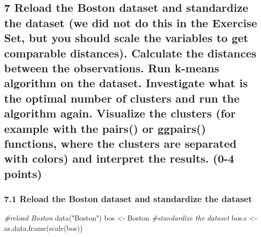 \documentclass[
]{article}
\newenvironment{Shaded}{\begin{snugshade}}{\end{snugshade}}
\newcommand{\CommentTok}[1]{\textcolor[rgb]{0.56,0.35,0.01}{\textit{#1}}}
\newcommand{\FunctionTok}[1]{\textcolor[rgb]{0.00,0.00,0.00}{#1}}
\newcommand{\NormalTok}[1]{#1}
\newcommand{\OtherTok}[1]{\textcolor[rgb]{0.56,0.35,0.01}{#1}}
\newcommand{\StringTok}[1]{\textcolor[rgb]{0.31,0.60,0.02}{#1}}
\begin{document}
\hypertarget{reload-the-boston-dataset-and-standardize-the-dataset-we-did-not-do-this-in-the-exercise-set-but-you-should-scale-the-variables-to-get-comparable-distances.-calculate-the-distances-between-the-observations.-run-k-means-algorithm-on-the-dataset.-investigate-what-is-the-optimal-number-of-clusters-and-run-the-algorithm-again.-visualize-the-clusters-for-example-with-the-pairs-or-ggpairs-functions-where-the-clusters-are-separated-with-colors-and-interpret-the-results.-0-4-points}{%
\subsection{7 Reload the Boston dataset and standardize the dataset (we
did not do this in the Exercise Set, but you should scale the variables
to get comparable distances). Calculate the distances between the
observations. Run k-means algorithm on the dataset. Investigate what is
the optimal number of clusters and run the algorithm again. Visualize
the clusters (for example with the pairs() or ggpairs() functions, where
the clusters are separated with colors) and interpret the results. (0-4
points)}\label{reload-the-boston-dataset-and-standardize-the-dataset-we-did-not-do-this-in-the-exercise-set-but-you-should-scale-the-variables-to-get-comparable-distances.-calculate-the-distances-between-the-observations.-run-k-means-algorithm-on-the-dataset.-investigate-what-is-the-optimal-number-of-clusters-and-run-the-algorithm-again.-visualize-the-clusters-for-example-with-the-pairs-or-ggpairs-functions-where-the-clusters-are-separated-with-colors-and-interpret-the-results.-0-4-points}}

\hypertarget{reload-the-boston-dataset-and-standardize-the-dataset}{%
\subsubsection{7.1 Reload the Boston dataset and standardize the
dataset}\label{reload-the-boston-dataset-and-standardize-the-dataset}}

\begin{Shaded}
\begin{Highlighting}[]
\CommentTok{\#reload Boston}
\FunctionTok{data}\NormalTok{(}\StringTok{"Boston"}\NormalTok{)}
\NormalTok{bos }\OtherTok{\textless{}{-}}\NormalTok{ Boston}
\CommentTok{\#standardize the dataset}
\NormalTok{bos.s }\OtherTok{\textless{}{-}} \FunctionTok{as.data.frame}\NormalTok{(}\FunctionTok{scale}\NormalTok{(bos))}
\end{Highlighting}
\end{Shaded}
\end{document}
